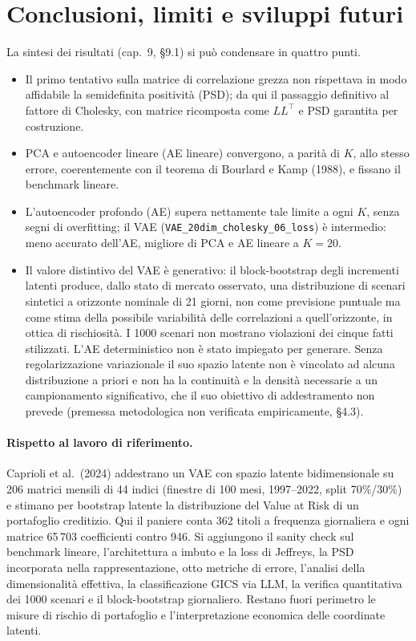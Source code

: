 \section{Conclusioni, limiti e sviluppi futuri}

La sintesi dei risultati (cap.~9, \S9.1) si può condensare in quattro punti.
\begin{itemize}[nosep]
\item Il primo tentativo sulla matrice di correlazione grezza non rispettava in modo affidabile la semidefinita positività (PSD); da qui il passaggio definitivo al fattore di Cholesky, con matrice ricomposta come $L L^{\top}$ e PSD garantita per costruzione.
\item PCA e autoencoder lineare (AE lineare) convergono, a parità di $K$, allo stesso errore, coerentemente con il teorema di Bourlard e Kamp (1988), e fissano il benchmark lineare.
\item L'autoencoder profondo (AE) supera nettamente tale limite a ogni $K$, senza segni di overfitting; il VAE (\texttt{VAE\_20dim\_cholesky\_06\_loss}) è intermedio: meno accurato dell'AE, migliore di PCA e AE lineare a $K = 20$.
\item Il valore distintivo del VAE è generativo: il block-bootstrap degli incrementi latenti produce, dallo stato di mercato osservato, una distribuzione di scenari sintetici a orizzonte nominale di 21 giorni, non come previsione puntuale ma come stima della possibile variabilità delle correlazioni a quell'orizzonte, in ottica di rischiosità. I 1000 scenari non mostrano violazioni dei cinque fatti stilizzati. L'AE deterministico non è stato impiegato per generare. Senza regolarizzazione variazionale il suo spazio latente non è vincolato ad alcuna distribuzione a priori e non ha la continuità e la densità necessarie a un campionamento significativo, che il suo obiettivo di addestramento non prevede (premessa metodologica non verificata empiricamente, \S4.3).
\end{itemize}

\paragraph{Rispetto al lavoro di riferimento.} Caprioli et al.\ (2024) addestrano un VAE con spazio latente bidimensionale su 206 matrici mensili di 44 indici (finestre di 100 mesi, 1997--2022, split 70\%/30\%) e stimano per bootstrap latente la distribuzione del Value at Risk di un portafoglio creditizio. Qui il paniere conta 362 titoli a frequenza giornaliera e ogni matrice 65\,703 coefficienti contro 946. Si aggiungono il sanity check sul benchmark lineare, l'architettura a imbuto e la loss di Jeffreys, la PSD incorporata nella rappresentazione, otto metriche di errore, l'analisi della dimensionalità effettiva, la classificazione GICS via LLM, la verifica quantitativa dei 1000 scenari e il block-bootstrap giornaliero. Restano fuori perimetro le misure di rischio di portafoglio e l'interpretazione economica delle coordinate latenti.

